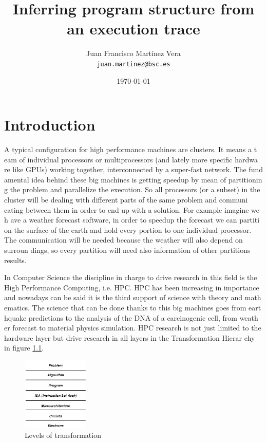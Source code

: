 \documentclass[12pt]{report}
\title{
  {\Huge Inferring program structure from an execution trace}
}
\author{
  {Juan Francisco Martínez Vera}\\
  {\tt juan.martinez@bsc.es}
}
\date{\today}
\begin{document}
\maketitle
\tableofcontents

\chapter{Introduction}
A typical configuration for high performance machines are clusters. It means a t
eam of individual processors or multiprocessors (and lately more specific hardwa
re like GPUs) working together, interconnected by a super-fast network. The fund
amental idea behind these big machines is getting speedup by mean of partitionin
g the problem and parallelize the execution. So all processors (or a subset) in 
the cluster will be dealing with different parts of the same problem and communi
cating between them in order to end up with a solution. For example imagine we h
ave a weather forecast software, in order to speedup the forecast we can partiti
on the surface of the earth and hold every portion to one individual processor. 
The communication will be needed because the weather will also depend on surroun
dings, so every partition will need also information of other partitions results.

In Computer Science the discipline in charge to drive research in this field is 
the High Performance Computing, i.e. HPC. HPC has been increasing in importance 
and nowadays can be said it is the third support of science with theory and math
ematics. The science that can be done thanks to this big machines goes from eart
hquake predictions to the analysis of the DNA of a carcinogenic cell, from weath
er forecast to material physics simulation. HPC research is not just limited to 
the hardware layer but drive research in all layers in the Transformation Hierar
chy\cite{transformationHierarchy} in figure \ref{transformationHierarchyImg}.

\begin{figure}
  \caption{Levels of transformation}
  \label{transformationHierarchyImg}
  \centering
    \includegraphics[width=120px]{transformationhierarchy.png}
\end{figure}
\end{document}
